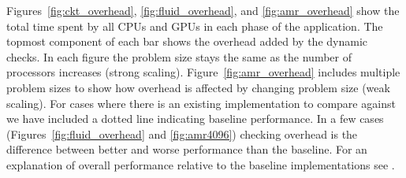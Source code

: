 Figures~\ref{fig:ckt_overhead}, \ref{fig:fluid_overhead}, and \ref{fig:amr_overhead} show 
the total time spent by all CPUs and GPUs in each phase of the application.  The topmost
component of each bar shows the overhead added by the dynamic checks.  In 
each figure the problem size stays the same as the number of processors increases
(strong scaling).  Figure~\ref{fig:amr_overhead} includes multiple problem sizes to show
how overhead is affected by changing problem size (weak scaling).  For cases where there
is an existing implementation to compare against we have included a dotted line indicating
baseline performance.  In a few cases (Figures~\ref{fig:fluid_overhead} and 
\ref{fig:amr4096}) checking overhead is the difference
between better and worse performance than the baseline.  For an explanation of overall
performance relative to the baseline implementations see \cite{Legion12}.

